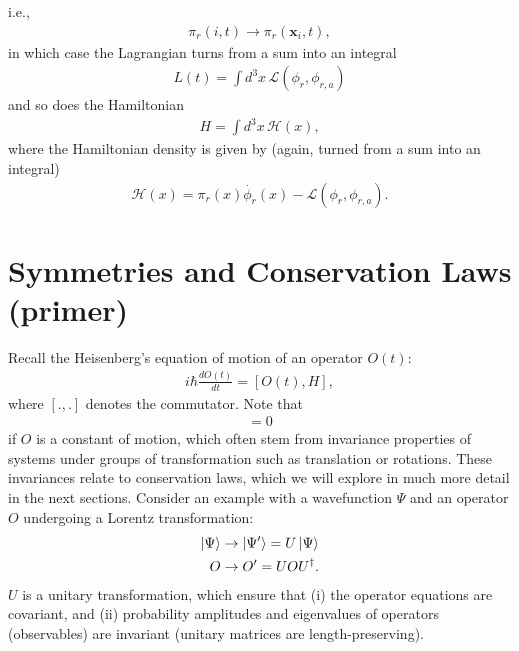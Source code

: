 \documentclass{book}
\numberwithin{equation}{section}
\theoremstyle{definition}
\newcommand{\lag}{\mathcal{L}}
\begin{document}
i.e., 
\begin{align}
\pi_r(i,t) \to \pi_r(\mathbf{x}_i,t),
\end{align}
in which case the Lagrangian turns from a sum into an integral
\begin{align}
L(t) = \int d^3x\, \lag(\phi_r, \phi_{r,a})
\end{align}
and so does the Hamiltonian
\begin{align}
H = \int d^3x\, \mathcal{H}(x),
\end{align}
where the Hamiltonian density is given by (again, turned from a sum into an integral)
\begin{align}
\mathcal{H}(x) = \pi_r(x)\dot{\phi_r}(x) - \lag(\phi_r, \phi_{r,a}).
\end{align}
\section{Symmetries and Conservation Laws (primer)}
Recall the Heisenberg's equation of motion of an operator $O(t)$:
\begin{align}
i\hbar \frac{dO(t)}{dt} = [O(t), H],
\end{align}
where $[.,.]$ denotes the commutator. Note that
\begin{align}
[O, H] = 0
\end{align}
if $O$ is a constant of motion, which often stem from invariance properties of systems under groups of transformation such as translation or rotations. These invariances relate to conservation laws, which we will explore in much more detail in the next sections. Consider an example with a wavefunction $\Psi$ and an operator $O$ undergoing a Lorentz transformation:
\begin{align}
\ket{\Psi} &\to \ket{\Psi'} = U\ket{\Psi}\\
O &\to O' = UOU^\dagger.
\end{align}
$U$ is a unitary transformation, which ensure that (i) the operator equations are covariant, and (ii) probability amplitudes and eigenvalues of operators (observables) are invariant (unitary matrices are length-preserving).\\
\end{document}
